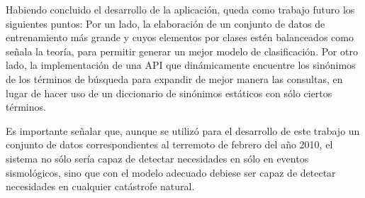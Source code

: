 Habiendo concluido el desarrollo de la aplicación, queda como trabajo futuro los siguientes puntos: Por un lado, la elaboración de un conjunto de datos de entrenamiento más grande y cuyos elementos por clases estén balanceados como señala la teoría, para permitir generar un mejor modelo de clasificación. Por otro lado, la implementación de una API que dinámicamente encuentre los sinónimos de los términos de búsqueda para expandir de mejor manera las consultas, en lugar de hacer uso de un diccionario de sinónimos estáticos con sólo ciertos términos.

Es importante señalar que, aunque se utilizó para el desarrollo de este trabajo un conjunto de datos correspondientes al terremoto de febrero del año 2010, el sistema no sólo sería capaz de detectar necesidades en sólo en eventos sismológicos, sino que con el modelo adecuado debiese ser capaz de detectar necesidades en cualquier catástrofe natural.

	






